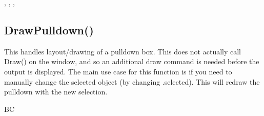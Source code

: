 \documentclass[letterpaper,10pt,english]{sphinxmanual}
\begin{document}
\sphinxAtStartPar
{}

\sphinxAtStartPar
{}, , , 

\ignorespaces 

\subsection{DrawPulldown()}
\label{\detokenize{reference/ui:drawpulldown}}\label{\detokenize{reference/ui:index-5}}
\sphinxAtStartPar
{}

\sphinxAtStartPar
{}

\sphinxAtStartPar
This handles layout/drawing of a pulldown box. This does not actually call Draw() on the window, and so an additional draw command is needed before the output is displayed.  The main use case for this function is if you need to manually change the selected object (by changing .selected). This will redraw the pulldown with the new selection.

\sphinxAtStartPar
{}

\begin{sphinxVerbatim}[commandchars=\\\{\}]
\end{sphinxVerbatim}

\sphinxAtStartPar
{}

\begin{sphinxVerbatim}[commandchars=\\\{\}]
\PYG{p}{[}BC\PYGZdq{}\PYG{p}{]}
\end{sphinxVerbatim}
\end{document}
